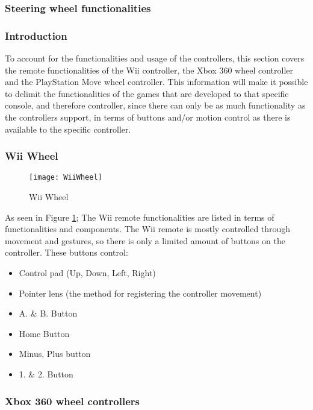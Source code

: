\subsubsection{Steering wheel functionalities}
\subsubsection*{Introduction}
To account for the functionalities and usage of the controllers, this section covers the remote functionalities of the Wii controller, the Xbox 360 wheel controller and the PlayStation Move wheel controller. This information will make it possible to delimit the functionalities of the games that are developed to that specific console, and therefore controller, since there can only be as much functionality as the controllers support, in terms of buttons and/or motion control as there is available to the specific controller.

\pagebreak[2]

\subsubsection*{Wii Wheel}
\parencite{Nintendo2013}

\begin{figure}[!htbp]
\centering
\texttt{[image: WiiWheel]} 
\caption{Wii Wheel \parencite{Nintendo2013}}
\label{fig:Wiimote}
\end{figure}
\bigskip

As seen in Figure \ref{fig:Wiimote}; The Wii remote functionalities are listed in terms of functionalities and components. The Wii remote is mostly controlled through movement and gestures, so there is only a limited amount of buttons on the controller. These buttons control:
\begin{itemize}
\item Control pad (Up, Down, Left, Right)
\item Pointer lens (the method for registering the controller movement)
\item A. \& B. Button
\item Home Button
\item Minus, Plus button
\item 1. \& 2. Button
\end{itemize}
\bigskip

\pagebreak[2]

\subsubsection*{Xbox 360 wheel controllers}
\parencite{Xbox2013}

